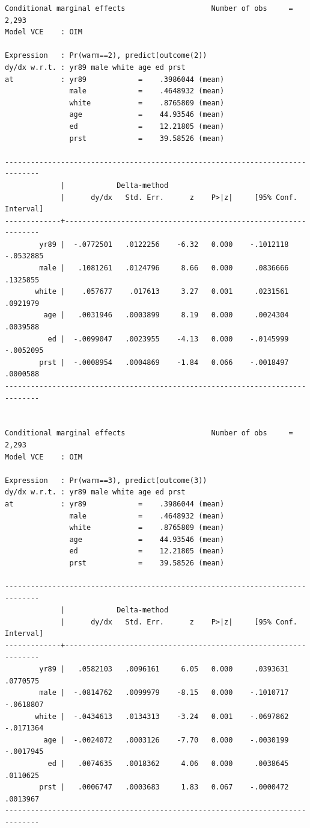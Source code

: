 \documentclass[
]{book}
\begin{document}
\begin{verbatim}
Conditional marginal effects                    Number of obs     =      2,293
Model VCE    : OIM

Expression   : Pr(warm==2), predict(outcome(2))
dy/dx w.r.t. : yr89 male white age ed prst
at           : yr89            =    .3986044 (mean)
               male            =    .4648932 (mean)
               white           =    .8765809 (mean)
               age             =    44.93546 (mean)
               ed              =    12.21805 (mean)
               prst            =    39.58526 (mean)

------------------------------------------------------------------------------
             |            Delta-method
             |      dy/dx   Std. Err.      z    P>|z|     [95% Conf. Interval]
-------------+----------------------------------------------------------------
        yr89 |  -.0772501   .0122256    -6.32   0.000    -.1012118   -.0532885
        male |   .1081261   .0124796     8.66   0.000     .0836666    .1325855
       white |    .057677    .017613     3.27   0.001     .0231561    .0921979
         age |   .0031946   .0003899     8.19   0.000     .0024304    .0039588
          ed |  -.0099047   .0023955    -4.13   0.000    -.0145999   -.0052095
        prst |  -.0008954   .0004869    -1.84   0.066    -.0018497    .0000588
------------------------------------------------------------------------------


Conditional marginal effects                    Number of obs     =      2,293
Model VCE    : OIM

Expression   : Pr(warm==3), predict(outcome(3))
dy/dx w.r.t. : yr89 male white age ed prst
at           : yr89            =    .3986044 (mean)
               male            =    .4648932 (mean)
               white           =    .8765809 (mean)
               age             =    44.93546 (mean)
               ed              =    12.21805 (mean)
               prst            =    39.58526 (mean)

------------------------------------------------------------------------------
             |            Delta-method
             |      dy/dx   Std. Err.      z    P>|z|     [95% Conf. Interval]
-------------+----------------------------------------------------------------
        yr89 |   .0582103   .0096161     6.05   0.000     .0393631    .0770575
        male |  -.0814762   .0099979    -8.15   0.000    -.1010717   -.0618807
       white |  -.0434613   .0134313    -3.24   0.001    -.0697862   -.0171364
         age |  -.0024072   .0003126    -7.70   0.000    -.0030199   -.0017945
          ed |   .0074635   .0018362     4.06   0.000     .0038645    .0110625
        prst |   .0006747   .0003683     1.83   0.067    -.0000472    .0013967
------------------------------------------------------------------------------



\end{verbatim}
\end{document}
